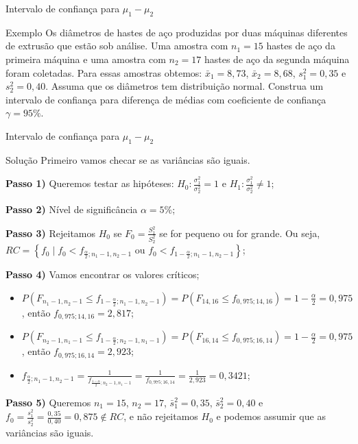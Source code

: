 \documentclass[9pt]{beamer}
\begin{document}
\begin{frame}{Intervalo de confiança para $\mu_1 - \mu_2$}

\large
\begin{block}{Exemplo}
	Os diâmetros de hastes de aço produzidas por duas máquinas diferentes de extrusão que estão sob análise. Uma amostra com $n_1 = 15$ hastes de aço da primeira máquina e uma amostra com $n_2=17$ hastes de aço da segunda máquina foram coletadas. Para essas amostras obtemos: $\bar{x}_1=8,73$, $\bar{x}_2=8,68$, $s_1^2=0,35$  e $s_2^2=0,40$. Assuma que os diâmetros tem distribuição normal. Construa um intervalo de confiança para diferença de médias com coeficiente de confiança $\gamma=95\%$.  
\end{block}
\normalsize

\end{frame}

\begin{frame}{Intervalo de confiança para $\mu_1 - \mu_2$}

\begin{block}{Solução}
	Primeiro vamos checar se as variâncias são iguais.
	
	\textbf{Passo 1)} Queremos testar as hipóteses: $H_0: \frac{\sigma_1^2}{\sigma_2^2} = 1$ e $H_1: \frac{\sigma_1^2}{\sigma_2^2} \neq 1$;
	
	\textbf{Passo 2)} Nível de significância $\alpha=5\%$;
	
	\textbf{Passo 3)} Rejeitamos $H_0$ se $F_0 = \frac{S_1^2}{S_2^2}$ se for pequeno ou for grande. Ou seja, $RC = \left\{ f_0 \mid f_0 < f_{\frac{\alpha}{2}; n_1-1, n_2-1} \mbox{ ou } f_0 < f_{1-\frac{\alpha}{2}; n_1-1, n_2-1} \right\}$;
	
	\textbf{Passo 4)} Vamos encontrar os valores críticos;
	\begin{itemize}
		\item $P(F_{n_1-1, n_2-1} \leq f_{1-\frac{\alpha}{2}; n_1-1, n_2-1}) = P(F_{14, 16} \leq f_{0,975; 14, 16}) = 1 - \frac{\alpha}{2} = 0,975$, então $f_{0,975; 14, 16} = 2,817$;
		\item $P(F_{n_2-1, n_1-1} \leq f_{1-\frac{\alpha}{2}; n_2-1, n_1-1}) = P(F_{16, 14} \leq f_{0,975; 16, 14}) = 1 - \frac{\alpha}{2} = 0,975$, então $f_{0,975; 16, 14} = 2,923$;
		\item $f_{\frac{\alpha}{2}; n_1-1, n_2-1} = \frac{1}{f_{\frac{1-\alpha}{2}; n_2-1, n_1-1}} = \frac{1}{f_{0,975; 16, 14}} = \frac{1}{2,923} = 0,3421$;
	\end{itemize}

	\textbf{Passo 5)} Queremos $n_1=15$, $n_2=17$, $\bar{s}_1^2=0,35$, $\bar{s}_2^2 = 0,40$ e $f_0 = \frac{s_1^2}{s_2^2} = \frac{0,35}{0,40} = 0,875 \not\in RC$, e não rejeitamos $H_0$ e podemos assumir que as variâncias são iguais.
\end{block}

\end{frame}
\end{document}
